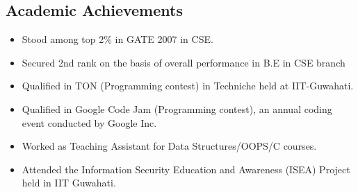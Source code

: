 \documentclass[margin,line]{resume}
\begin{document}
\begin{resume}
     
 \section{\mysidestyle Academic Achievements}
\begin{itemize}
  \item Stood among top 2\% in GATE 2007 in CSE.
   \item Secured 2nd rank on the basis of overall performance in B.E in CSE branch
\item Qualified in TON (Programming contest) in Techniche held at IIT-Guwahati. 
\item Qualified in Google Code Jam (Programming contest), an annual coding event conducted by Google Inc.
\item Worked as Teaching Assistant for Data Structures/OOPS/C courses.
\item Attended the Information Security Education and Awareness (ISEA) Project held in IIT Guwahati.
 \end{itemize}

                                                                                                                                          




\end{resume}
\end{document}
